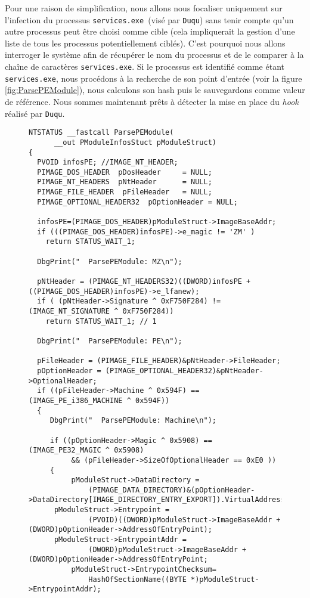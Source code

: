 \documentclass[times,11pt,fullpage]{article}
\newcommand{\Duqu}{\texttt{Duqu}}
\newcommand{\service}{\texttt{services.exe}}
\begin{document}
Pour une raison de simplification, nous allons nous focaliser uniquement sur l'infection du processus \service\ (visé par \Duqu) sans tenir compte qu'un autre processus peut être choisi comme cible (cela impliquerait la gestion d'une liste de tous les processus potentiellement ciblés). C'est pourquoi nous allons interroger le système afin de récupérer le nom du processus et de le comparer à la chaîne de caractères \service. Si le processus est identifié comme étant \service, nous procédons à la recherche de son point d'entrée (voir la figure \ref{fig:ParsePEModule}), nous calculons son hash puis le sauvegardons comme valeur de référence. Nous sommes maintenant prêts à détecter la mise en place du \emph{hook} réalisé par \Duqu.

\begin{figure}
\scriptsize
\begin{verbatim}
NTSTATUS __fastcall ParsePEModule(
      __out PModuleInfosStuct pModuleStruct)
{
  PVOID infosPE; //IMAGE_NT_HEADER; 
  PIMAGE_DOS_HEADER  pDosHeader     = NULL;
  PIMAGE_NT_HEADERS  pNtHeader      = NULL;
  PIMAGE_FILE_HEADER  pFileHeader   = NULL;
  PIMAGE_OPTIONAL_HEADER32  pOptionHeader = NULL;

  infosPE=(PIMAGE_DOS_HEADER)pModuleStruct->ImageBaseAddr; 
  if (((PIMAGE_DOS_HEADER)infosPE)->e_magic != 'ZM' )
    return STATUS_WAIT_1;

  DbgPrint("  ParsePEModule: MZ\n");

  pNtHeader = (PIMAGE_NT_HEADERS32)((DWORD)infosPE + ((PIMAGE_DOS_HEADER)infosPE)->e_lfanew);
  if ( (pNtHeader->Signature ^ 0xF750F284) != (IMAGE_NT_SIGNATURE ^ 0xF750F284)) 
    return STATUS_WAIT_1; // 1

  DbgPrint("  ParsePEModule: PE\n");

  pFileHeader = (PIMAGE_FILE_HEADER)&pNtHeader->FileHeader;
  pOptionHeader = (PIMAGE_OPTIONAL_HEADER32)&pNtHeader->OptionalHeader;
  if ((pFileHeader->Machine ^ 0x594F) == (IMAGE_PE_i386_MACHINE ^ 0x594F)) 
  {
     DbgPrint("  ParsePEModule: Machine\n");

     if ((pOptionHeader->Magic ^ 0x5908) == (IMAGE_PE32_MAGIC ^ 0x5908) 
          && (pFileHeader->SizeOfOptionalHeader == 0xE0 )) 
     {
          pModuleStruct->DataDirectory = 
              (PIMAGE_DATA_DIRECTORY)&(pOptionHeader->DataDirectory[IMAGE_DIRECTORY_ENTRY_EXPORT]).VirtualAddress;  
	  pModuleStruct->Entrypoint = 
              (PVOID)((DWORD)pModuleStruct->ImageBaseAddr + (DWORD)pOptionHeader->AddressOfEntryPoint);
  	  pModuleStruct->EntrypointAddr = 
              (DWORD)pModuleStruct->ImageBaseAddr + (DWORD)pOptionHeader->AddressOfEntryPoint;
          pModuleStruct->EntrypointChecksum=
              HashOfSectionName((BYTE *)pModuleStruct->EntrypointAddr);
     

\end{verbatim}
\end{figure}
\end{document}

